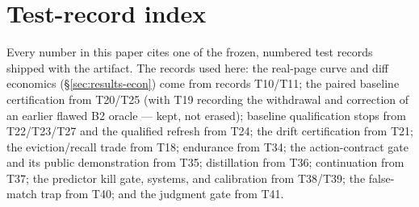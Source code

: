 \documentclass{article} %
\begin{document}
\section{Test-record index}
\label{app:records}

Every number in this paper cites one of the frozen, numbered test records shipped with
the artifact. The records used here: the real-page curve and diff economics
(\S\ref{sec:results-econ}) come from records T10/T11; the paired baseline
certification from T20/T25 (with T19 recording the withdrawal and correction of an
earlier flawed B2 oracle --- kept, not erased); baseline qualification stops from
T22/T23/T27 and the qualified refresh from T24; the drift certification from T21; the
eviction/recall trade from T18; endurance from T34; the action-contract gate and its
public demonstration from T35; distillation from T36; continuation from T37; the
predictor kill gate, systems, and calibration from T38/T39; the false-match trap from
T40; and the judgment gate from T41.
\end{document}
